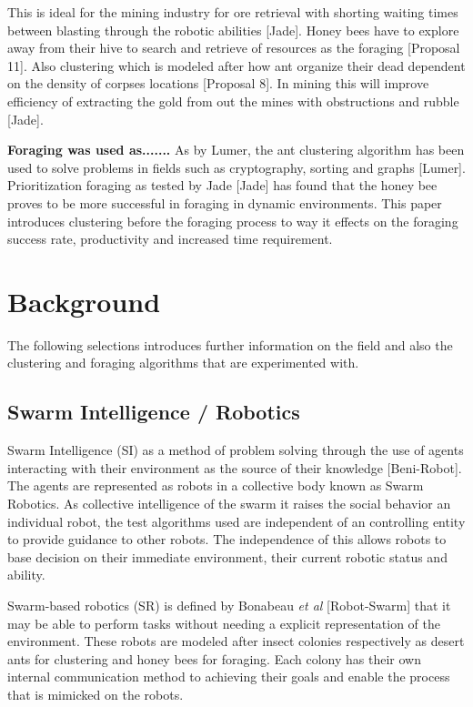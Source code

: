 \documentclass[12pt]{article}
\begin{document}
\par{This is ideal for the mining industry for ore retrieval with shorting waiting times between blasting through the robotic abilities [Jade]. Honey bees have to explore away from their hive to search and retrieve of resources as the foraging [Proposal 11]. Also clustering which is modeled after how ant organize their dead dependent on the density of corpses locations [Proposal 8]. In mining this will improve efficiency of extracting the gold from out the mines with obstructions and rubble [Jade].} 

\par{\textbf{Foraging was used as.......} As by Lumer, the ant clustering algorithm has been used to solve problems in fields such as cryptography, sorting and graphs [Lumer]. Prioritization foraging as tested by Jade [Jade] has found that the honey bee proves to be more successful in foraging in dynamic environments. This paper introduces clustering before the foraging process to way it effects on the foraging success rate, productivity and increased time requirement.}

\section{Background}

The following selections introduces further information on the field and also the clustering and foraging algorithms that are experimented with.

\subsection{Swarm Intelligence / Robotics}

\par{Swarm Intelligence (SI) as a method of problem solving through the use of agents interacting with their environment as the source of their knowledge [Beni-Robot]. The agents are represented as robots in a collective body known as Swarm Robotics. As collective intelligence of the swarm it raises the social behavior an individual robot, the test algorithms used are independent of an controlling entity to provide guidance to other robots. The independence of this allows robots to base decision on their immediate environment, their current robotic status and ability.}

\par{Swarm-based robotics (SR) is defined by Bonabeau \textit{et al} [Robot-Swarm] that it may be able to perform tasks without needing a explicit representation of the environment. These robots are modeled after insect colonies respectively as desert ants for clustering and honey bees for foraging. Each colony has their own internal communication method to achieving their goals and enable the process that is mimicked on the robots.}
\end{document}
